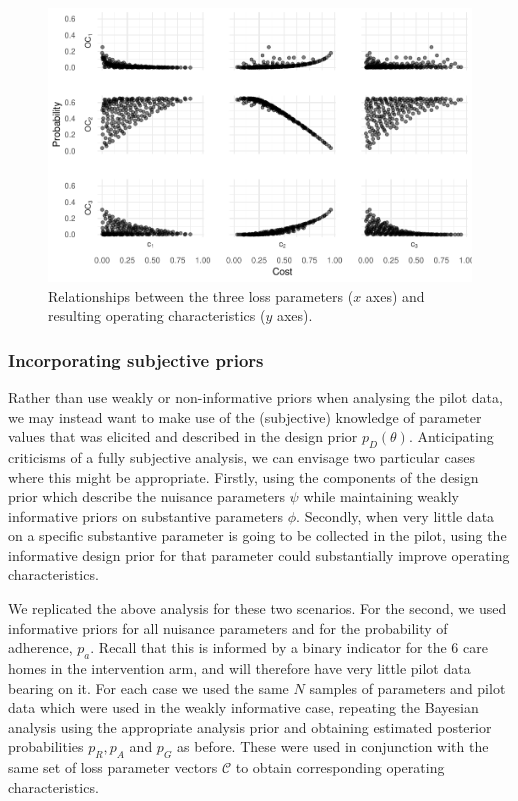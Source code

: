 \documentclass[AMA,STIX1COL]{WileyNJD-v2}
\begin{document}
\begin{figure}
\centering
\includegraphics[scale=0.8]{./Figures/cost_OCs}
\caption{Relationships between the three loss parameters ($x$ axes) and resulting operating characteristics ($y$ axes).}
\label{fig:cost_OCs}
\end{figure}

\subsubsection{Incorporating subjective priors}

Rather than use weakly or non-informative priors when analysing the pilot data, we may instead want to make use of the (subjective) knowledge of parameter values that was elicited and described in the design prior $p_D(\theta)$. Anticipating criticisms of a fully subjective analysis, we can envisage two particular cases where this might be appropriate. Firstly, using the components of the design prior which describe the nuisance parameters $\psi$ while maintaining weakly informative priors on substantive parameters $\phi$. Secondly, when very little data on a specific substantive parameter is going to be collected in the pilot, using the informative design prior for that parameter could substantially improve operating characteristics.

We replicated the above analysis for these two scenarios. For the second, we used informative priors for all nuisance parameters and for the probability of adherence, $p_a$. Recall that this is informed by a binary indicator for the 6 care homes in the intervention arm, and will therefore have very little pilot data bearing on it. For each case we used the same $N$ samples of parameters and pilot data which were used in the weakly informative case, repeating the Bayesian analysis using the appropriate analysis prior and obtaining estimated posterior probabilities $p_R, p_A$ and $p_G$ as before. These were used in conjunction with the same set of loss parameter vectors $\mathcal{C}$ to obtain corresponding operating characteristics.
\end{document}

